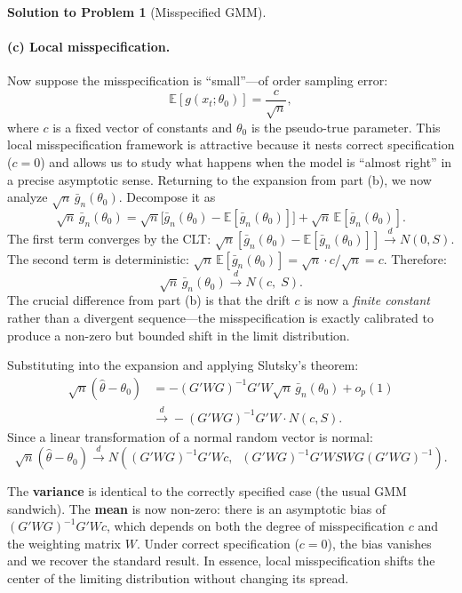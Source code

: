 \documentclass[12pt]{article}
\newcommand{\E}{\mathbb E}
\theoremstyle{definition}
\newtheorem{solution}{Solution to Problem}
\begin{document}
\begin{solution}[Misspecified GMM]
\paragraph{(c) Local misspecification.} Now suppose the misspecification is ``small''---of order sampling error:
\[
\E[g(x_t;\theta_0)] = \frac{c}{\sqrt{n}},
\]
where $c$ is a fixed vector of constants and $\theta_0$ is the pseudo-true parameter. This local misspecification framework is attractive because it nests correct specification ($c=0$) and allows us to study what happens when the model is ``almost right'' in a precise asymptotic sense. Returning to the expansion from part (b), we now analyze $\sqrt{n}\,\bar{g}_n(\theta_0)$. Decompose it as
\[
\sqrt{n}\,\bar{g}_n(\theta_0) = \sqrt{n}\bigl[\bar{g}_n(\theta_0)-\E[\bar{g}_n(\theta_0)]\bigr] + \sqrt{n}\,\E[\bar{g}_n(\theta_0)].
\]
The first term converges by the CLT: $\sqrt{n}[\bar{g}_n(\theta_0)-\E[\bar{g}_n(\theta_0)]]\xrightarrow{d}N(0,S)$. The second term is deterministic: $\sqrt{n}\,\E[\bar{g}_n(\theta_0)]=\sqrt{n}\cdot c/\sqrt{n}=c$. Therefore:
\[
\sqrt{n}\,\bar{g}_n(\theta_0) \xrightarrow{d} N(c,\;S).
\]
The crucial difference from part (b) is that the drift $c$ is now a \emph{finite constant} rather than a divergent sequence---the misspecification is exactly calibrated to produce a non-zero but bounded shift in the limit distribution.

Substituting into the expansion and applying Slutsky's theorem:
\begin{align*}
\sqrt{n}(\hat\theta-\theta_0) &= -(G'WG)^{-1}G'W\sqrt{n}\,\bar{g}_n(\theta_0) + o_p(1) \\
&\xrightarrow{d} -(G'WG)^{-1}G'W \cdot N(c,S).
\end{align*}
Since a linear transformation of a normal random vector is normal:
\[
\boxed{\sqrt{n}(\hat\theta-\theta_0) \xrightarrow{d} N\!\left((G'WG)^{-1}G'Wc,\;\;(G'WG)^{-1}G'WSWG(G'WG)^{-1}\right).}
\]

The \textbf{variance} is identical to the correctly specified case (the usual GMM sandwich). The \textbf{mean} is now non-zero: there is an asymptotic bias of $(G'WG)^{-1}G'Wc$, which depends on both the degree of misspecification $c$ and the weighting matrix $W$. Under correct specification ($c=0$), the bias vanishes and we recover the standard result. In essence, local misspecification shifts the center of the limiting distribution without changing its spread.

\bigskip

\end{solution}
\end{document}
